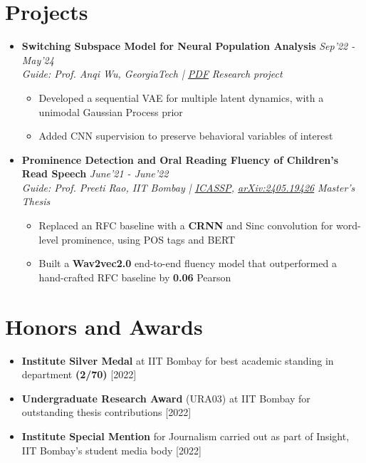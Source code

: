 \documentclass[10pt,letterpaper,sans]{moderncv}
\providecommand{\sl}{\slshape}
\begin{document}
\section{Projects}
\begin{itemize}
\item \textbf{Switching Subspace Model for Neural Population Analysis} \hfill{\sl Sep'22 - May'24}\\
\textit{Guide: Prof. Anqi Wu, GeorgiaTech | \href{https://methi1999.github.io/assets/pdf/switching_subspace_model_neurips.pdf}{PDF}} \hfill{\sl Research project}\\
\vspace{-8pt}
\begin{itemize}
\item Developed a sequential VAE for multiple latent dynamics, with a unimodal Gaussian Process prior
\item Added CNN supervision to preserve behavioral variables of interest
\end{itemize}
\item \textbf{Prominence Detection and Oral Reading Fluency of Children's Read Speech} \hfill{\sl  June'21 - June'22}\\
\textit{Guide: Prof. Preeti Rao, IIT Bombay | \href{https://doi.org/10.1109/ICASSP43922.2022.9747780}{ICASSP}, \href{https://arxiv.org/abs/2405.19426}{arXiv:2405.19426}} \hfill{\sl Master's Thesis}\\
\vspace{-8pt}
\begin{itemize}
\item Replaced an RFC baseline with a \textbf{CRNN} and Sinc convolution for word-level prominence, using POS tags and BERT
\item Built a \textbf{Wav2vec2.0} end-to-end fluency model that outperformed a hand-crafted RFC baseline by \textbf{0.06} Pearson
\end{itemize}
\end{itemize}
\section{Honors and Awards}
\enlargethispage{1.2\baselineskip}
\begin{itemize}
\item \textbf{Institute Silver Medal} at IIT Bombay for best academic standing in department \textbf{(2/70)} \hfill{\small [2022]}
\item \textbf{Undergraduate Research Award} (URA03) at IIT Bombay for outstanding thesis contributions \hfill{\small [2022]}
\item \textbf{Institute Special Mention} for Journalism carried out as part of Insight, IIT Bombay's student media body \hfill {\small [2022]}
\end{itemize}
\end{document}
